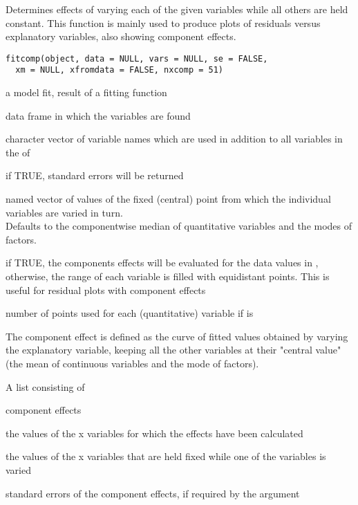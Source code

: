 \documentclass{article}
\begin{document}
\begin{Description}\relax
Determines effects of varying each of the given variables while all
others are held constant. This function is mainly used to produce
plots of residuals versus explanatory variables, also showing
component effects.
\end{Description}
\begin{Usage}
\begin{verbatim}
fitcomp(object, data = NULL, vars = NULL, se = FALSE,
  xm = NULL, xfromdata = FALSE, nxcomp = 51)
\end{verbatim}
\end{Usage}
\begin{Arguments}
\begin{ldescription}
\item[\code{object}] a model fit, result of a fitting function
\item[\code{data}] data frame in which the variables are found
\item[\code{vars}] character vector of variable names which are used in
addition to all variables in the  of  
\item[\code{se}] if TRUE, standard errors will be returned
\item[\code{xm}] named vector of values of the fixed (central) point from
which the individual variables are varied in turn. \\
Defaults to the componentwise median of quantitative variables and
the modes of factors.
\item[\code{xfromdata}] if TRUE, the components effects will be evaluated for
the data values in , otherwise, the range of each
variable is filled with  equidistant points.
This is useful for residual plots with component effects
\item[\code{nxcomp}] number of points used for each (quantitative) variable
if  is 
\end{ldescription}
\end{Arguments}
\begin{Details}\relax
The component effect is defined as the curve of fitted values
obtained by varying the explanatory variable, keeping all the other
variables at their "central value" (the mean of continuous variables
and the mode of factors).
\end{Details}
\begin{Value}
A list consisting of
\begin{ldescription}
\item[\code{comp}] component effects
\item[\code{x}] the values of the x variables for which the effects have been
calculated
\item[\code{xm}] the values of the x variables that are held fixed while one
of the variables is varied
\item[\code{se}] standard errors of the component effects, if required by the
argument 
\end{ldescription}
\end{Value}
\end{document}
